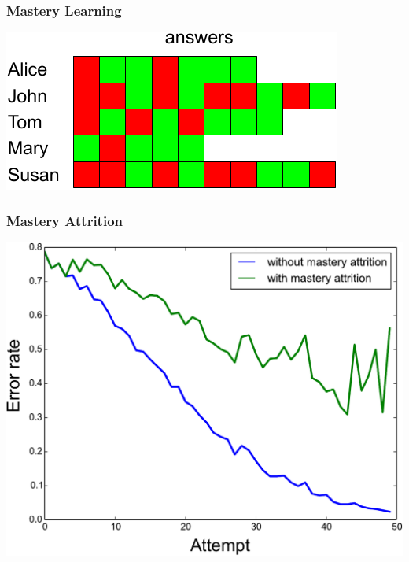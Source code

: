 \documentclass[bigger]{beamer}
\begin{document}
\begin{frame}
  \frametitle{Mastery Learning}
  \begin{center}
    \includegraphics[width=.8\linewidth]{answers-mastery}
  \end{center}
\end{frame}

\begin{frame}
  \frametitle{Mastery Attrition}
  \begin{center}
    \includegraphics[width=.75\linewidth]{demo-mastery-attrition}
  \end{center}
\end{frame}
\end{document}
